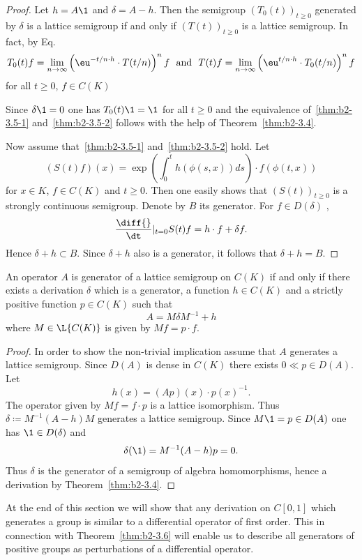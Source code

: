 \begin{proof}
Let $h = A\1$ and $\delta = A - h$.
Then the semigroup $(T_{0}(t))_{t \geq 0}$ generated by $\delta$ is a lattice semigroup if and only if\/ $(T(t))_{t \geq 0}$ is a lattice semigroup. In fact, by 
Eq.~ %
\[
T_{0}(t)f = \lim_{n \to \infty} \left(\eu^{-t/n \cdot h} \cdot T(t/n)\right)^{n}f 
\ \text{ and }\  
 T(t)f = \lim_{n \to \infty} \left(\eu^{{t/n} \cdot h} \cdot T_{0}(t/n)\right)^{n}f
\]
 for all $t \geq 0$, $f \in C(K)$

Since $\delta \1 = 0$ one has $T_{0}(t)\1 = \1$ for all $t \geq 0$ and the equivalence of~\ref{thm:b2-3.5-1} and~\ref{thm:b2-3.5-2} follows with the help of Theorem~\ref{thm:b2-3.4}.

Now assume that~\ref{thm:b2-3.5-1} and~\ref{thm:b2-3.5-2} hold.
Let
\[
(S(t)f) (x) = \exp\left( \int_{0}^{t} h(\phi(s,x))ds \right) \cdot f(\phi(t,x))
\]
for $x \in K$, $f \in C (K)$ and $t \geq 0$. 
Then one easily shows that $(S(t))_{t\geq 0}$ is a strongly con\-tinu\-ous semigroup.
Denote by $B$ its generator.
For $f \in D(\delta)$ , 
%
\[
	 \frac{\diff{}}{\dt}|_{t = 0}S(t)f = h \cdot f + \delta f .
\]
%
Hence $\delta + h \subset B$.  
Since $\delta + h$ also is a generator, it follows that $\delta + h = B$.
\end{proof}%
\begin{theorem}\label{thm:b2-3.6}
An operator $A$ is generator of a lattice semigroup on $C(K)$ if and only if there exists a derivation $\delta$ which is a generator, a function $h \in C(K)$ and a strictly positive function $p \in C(K)$ such that
\begin{equation} \label{eq:b2-3.7}
A = M\delta M^{-1} + h
\end{equation}
where $M \in \L{C(K)}$ is given by $Mf = p \cdot f$.
\end{theorem}
\begin{proof}
In order to show the non-trivial implication assume that $A$ generates a lattice semigroup.
Since $D(A)$ is dense in $C(K)$ there exists $0 \ll p \in D(A)$.
Let 
%
\[
	h(x) = (Ap)(x) \cdot p(x)^{-1}.
\]
%
The operator given by $Mf = f \cdot p$ is a lattice isomorphism.
Thus $\delta \coloneqq M^{-1}(A - h)M$ generates a lattice semigroup.
Since $M\1 = p \in D(A)$ one has $\1 \in D(\delta)$ and %
\[
	\delta(\1) = M^{-1}(A - h)p = 0.
\]
%
Thus $\delta$ is the generator of a semigroup of algebra homomorphisms, hence a derivation by Theorem~\ref{thm:b2-3.4}.
\end{proof}
At the end of this section we will show that any derivation on $C[0,1]$ which generates a group is similar to a differential operator of first order.
This in connection with Theorem~\ref{thm:b2-3.6} will enable us to describe all generators of positive groups as perturbations of a differential operator.

